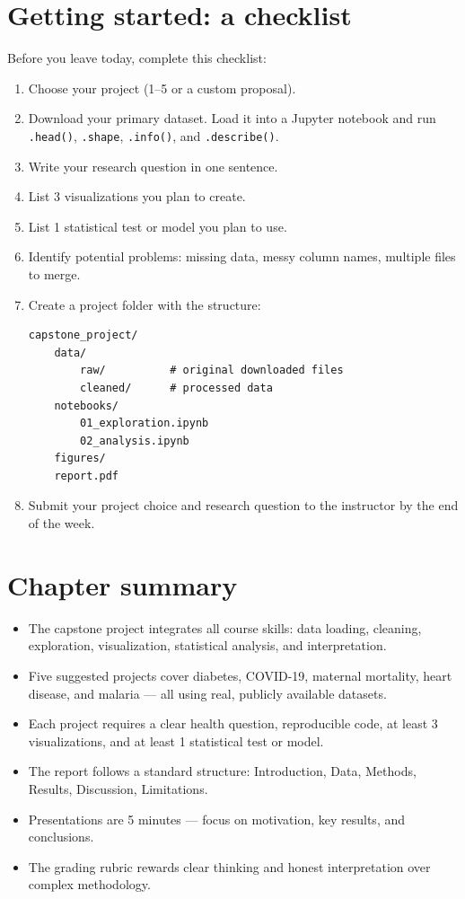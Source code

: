 \section{Getting started: a checklist}

\begin{exercise}
Before you leave today, complete this checklist:
\begin{enumerate}
  \item Choose your project (1--5 or a custom proposal).
  \item Download your primary dataset. Load it into a Jupyter notebook and run \texttt{.head()}, \texttt{.shape}, \texttt{.info()}, and \texttt{.describe()}.
  \item Write your research question in one sentence.
  \item List 3 visualizations you plan to create.
  \item List 1 statistical test or model you plan to use.
  \item Identify potential problems: missing data, messy column names, multiple files to merge.
  \item Create a project folder with the structure:
\begin{verbatim}
capstone_project/
    data/
        raw/          # original downloaded files
        cleaned/      # processed data
    notebooks/
        01_exploration.ipynb
        02_analysis.ipynb
    figures/
    report.pdf
\end{verbatim}
  \item Submit your project choice and research question to the instructor by the end of the week.
\end{enumerate}
\end{exercise}

\section{Chapter summary}

\begin{itemize}
  \item The capstone project integrates all course skills: data loading, cleaning, exploration, visualization, statistical analysis, and interpretation.
  \item Five suggested projects cover diabetes, COVID-19, maternal mortality, heart disease, and malaria --- all using real, publicly available datasets.
  \item Each project requires a clear health question, reproducible code, at least 3 visualizations, and at least 1 statistical test or model.
  \item The report follows a standard structure: Introduction, Data, Methods, Results, Discussion, Limitations.
  \item Presentations are 5 minutes --- focus on motivation, key results, and conclusions.
  \item The grading rubric rewards clear thinking and honest interpretation over complex methodology.
\end{itemize}
